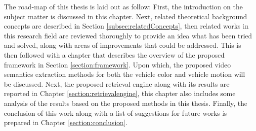 The road-map of this thesis is laid out as follow: First, the introduction on the subject matter is discussed in this chapter. Next, related theoretical background concepts are described in Section \ref{subsec:relatedConcepts}, then related works in this research field are reviewed thoroughly to provide an idea what has been tried and solved, along with areas of improvements that could be addressed. This is then followed with a chapter that describes the overview of the proposed framework in Section \ref{section:framework}. Upon which, the proposed video semantics extraction methods for both the vehicle color and vehicle motion will be discussed. Next, the proposed retrieval engine along with its results are reported in Chapter \ref{section:retrievalengine}, this chapter also includes some analysis of the results based on the proposed methods in this thesis. Finally, the conclusion of this work along with a list of suggestions for future works is prepared in Chapter \ref{section:conclusion}. 

